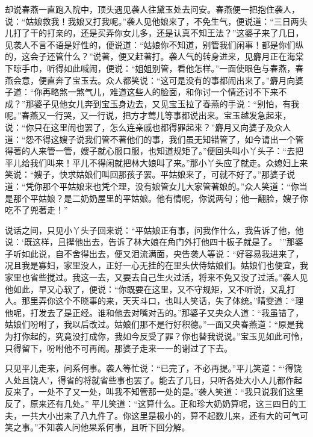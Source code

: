 \begin{parag}


    却说春燕一直跑入院中，顶头遇见袭人往黛玉处去问安。春燕便一把抱住袭人，说：“姑娘救我！我娘又打我呢。”袭人见他娘来了，不免生气，便说道：“三日两头儿打了干的打亲的，还是买弄你女儿多，还是认真不知王法？”这婆子来了几日，见袭人不言不语是好性的，便说道：“姑娘你不知道，别管我们闲事！都是你们纵的，这会子还管什么？”说著，便又赶著打。袭人气的转身进来，见麝月正在海棠下晾手巾，听得如此喊闹，便说：“姐姐别管，看他怎样。”一面使眼色与春燕，春燕会意，便直奔了宝玉去。众人都笑说：“这可是没有的事都闹出来了。”麝月向婆子道：“你再略煞一煞气儿，难道这些人的脸面，和你讨一个情还讨不下来不成？”那婆子见他女儿奔到宝玉身边去，又见宝玉拉了春燕的手说：“别怕，有我呢。”春燕又一行哭，又一行说，把方才莺儿等事都说出来。宝玉越发急起来，说：“你只在这里闹也罢了，怎么连亲戚也都得罪起来？”麝月又向婆子及众人道：“怨不得这嫂子说我们管不著他们的事，我们虽无知错管了，如今请出一个管得著的人来管一管，嫂子就心服口服，也知道规矩了。”便回头叫小丫头子：“去把平儿给我们叫来！平儿不得闲就把林大娘叫了来。”那小丫头应了就走。众媳妇上来笑说：“嫂子，快求姑娘们叫回那孩子罢。平姑娘来了，可就不好了。”那婆子说道：“凭你那个平姑娘来也凭个理，没有娘管女儿大家管著娘的。”众人笑道：“你当是那个平姑娘？是二奶奶屋里的平姑娘。他有情呢，你说两句；他一翻脸，嫂子你吃不了兜著走！”
\end{parag}


\begin{parag}


    说话之间，只见小丫头子回来说：“平姑娘正有事，问我作什么，我告诉了他，他说：‘既这样，且撵他出去，告诉了林大娘在角门外打他四十板子就是了。 ’”那婆子听如此说，自不舍得出去，便又泪流满面，央告袭人等说：“好容易我进来了，况且我是寡妇，家里没人，正好一心无挂的在里头伏侍姑娘们。姑娘们也便宜，我家里也省些搅过。我这一去，又要去自己生火过活，将来不免又没了过活。”袭人见他如此，早又心软了，便说：“你既要在这里，又不守规矩，又不听说，又乱打人。那里弄你这个不晓事的来，天天斗口，也叫人笑话，失了体统。”晴雯道：“理他呢，打发去了是正经。谁和他去对嘴对舌的。”那婆子又央众人道：“我虽错了，姑娘们吩咐了，我以后改过。姑娘们那不是行好积德。”一面又央春燕道：“原是我为打你起的，究竟没打成你，我如今反受了罪？你也替我说说。”宝玉见如此可怜，只得留下，吩咐他不可再闹。那婆子走来一一的谢过了下去。
\end{parag}


\begin{parag}


    只见平儿走来，问系何事。袭人等忙说：“已完了，不必再提。”平儿笑道：“‘得饶人处且饶人’，得省的将就省些事也罢了。能去了几日，只听各处大小人儿都作起反来了，一处不了又一处，叫我不知管那一处的是。”袭人笑道：“我只说我们这里反了，原来还有几处。” 平儿笑道：“这算什么。正和珍大奶奶算呢，这三四日的工夫，一共大小出来了八九件了。你这里是极小的，算不起数儿来，还有大的可气可笑之事。”不知袭人问他果系何事，且听下回分解。
\end{parag}
